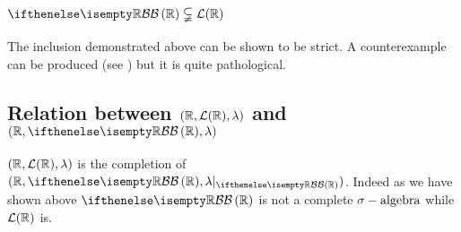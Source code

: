\subsection{\texorpdfstring{$\B[\R] \subsetneqq \Leb(\R)$}{B(R) is strictly included in L(R)}}
The inclusion demonstrated above can be shown to be strict. A counterexample can be produced (see \href{https://math.stackexchange.com/questions/141017/lebesgue-measurable-set-that-is-not-a-borel-measurable-set}{\color{blue}{here}}) but it is quite pathological.

\subsection{Relation between \texorpdfstring{$(\mathbb{R},\mathcal{L}(\mathbb{R}),\lambda)$}{(R,L(R),l)} and \texorpdfstring{$(\R,\B[\R],\lambda)$}{(R,B(R),l)}}
$(\mathbb{R},\mathcal{L}(\mathbb{R}),\lambda)$ is the completion of $(\R,\B[\R],\lambda|_{\B[\R]})$. Indeed as we have shown above $\B[\R]$ is not a complete $\sigma-\text{algebra}$ while $\mathcal{L}(\mathbb{R})$ is.
